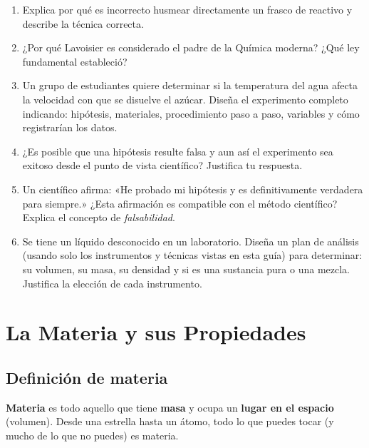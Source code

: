\documentclass[12pt, a4paper]{article}
\begin{document}
\begin{enumerate}[leftmargin=*]
  \item \medio{} Explica por qué es incorrecto husmear directamente un frasco de reactivo y describe la técnica correcta.

  \item \medio{} ¿Por qué Lavoisier es considerado el padre de la Química moderna? ¿Qué ley fundamental estableció?

  \item \dificil{} Un grupo de estudiantes quiere determinar si la temperatura del agua afecta la velocidad con que se disuelve el azúcar. Diseña el experimento completo indicando: hipótesis, materiales, procedimiento paso a paso, variables y cómo registrarían los datos.

  \item \dificil{} ¿Es posible que una hipótesis resulte falsa y aun así el experimento sea exitoso desde el punto de vista científico? Justifica tu respuesta.

  \item \dificil{} Un científico afirma: «He probado mi hipótesis y es definitivamente verdadera para siempre.» ¿Esta afirmación es compatible con el método científico? Explica el concepto de \emph{falsabilidad}.

  \item \dificil{} Se tiene un líquido desconocido en un laboratorio. Diseña un plan de análisis (usando solo los instrumentos y técnicas vistas en esta guía) para determinar: su volumen, su masa, su densidad y si es una sustancia pura o una mezcla. Justifica la elección de cada instrumento.
\end{enumerate}

\newpage

\section{La Materia y sus Propiedades}

\subsection{Definición de materia}

\begin{cuadroteoria}
\textbf{Materia} es todo aquello que tiene \textbf{masa} y ocupa un \textbf{lugar en el espacio} (volumen). Desde una estrella hasta un átomo, todo lo que puedes tocar (y mucho de lo que no puedes) es materia.
\end{cuadroteoria}
\end{document}
